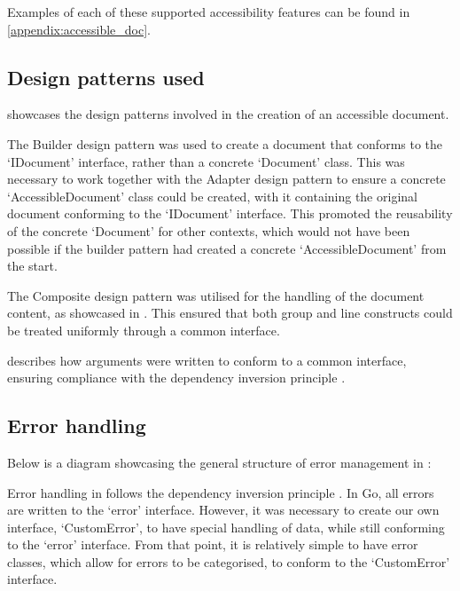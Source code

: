 Examples of each of these supported accessibility features can be found in \cref{appendix:accessible_doc}.

\subsection{\nmu Design \nmu patterns used}\label{specification_design:design_patterns_used}
 showcases the design patterns involved in the creation of an accessible document. 



The Builder design pattern \parencite{builder_design_pattern} was used to create a document that conforms to the `IDocument' interface, rather than a concrete `Document' class. This was necessary to work together with the Adapter design pattern \parencite{adapter_design_pattern} to ensure a concrete `AccessibleDocument' class could be created, with it containing the original document conforming to the `IDocument' interface. This promoted the reusability of the concrete `Document' for other contexts, which would not have been possible if the builder pattern had created a concrete `AccessibleDocument' from the start.

The Composite design pattern \parencite{composite_design_pattern} was utilised for the handling of the document content, as showcased in . This ensured that both group and line constructs could be treated uniformly through a common interface. 

 describes how arguments were written to conform to a common interface, ensuring compliance with the dependency inversion principle \parencite{dependency_inversion}.
\subsection{\nmu Error \nmu handling}\label{specification_design:error_handling}
Below is a diagram showcasing the general structure of error management in \lintex :



Error handling in \lintexspaced follows the dependency inversion principle \parencite{dependency_inversion}. In Go, all errors are written to the `error' interface. However, it was necessary to create our own interface, `CustomError', to have special handling of data, while still conforming to the `error' interface. From that point, it is relatively simple to have error classes, which allow for errors to be categorised, to conform to the `CustomError' interface.

